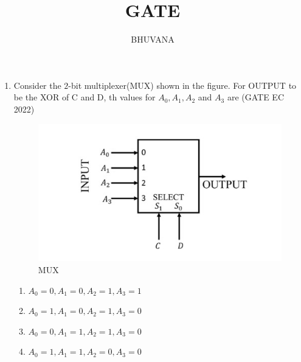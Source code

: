 \documentclass{article}
\begin{document}
 \title{GATE}
 \author{BHUVANA}
 \maketitle

 \begin{enumerate}
 \item

	 Consider the $2$-bit multiplexer(MUX) shown in the figure. For OUTPUT to be the XOR of C and D, th values for $A_0,A_1,A_2$ and $A_3$  are \underline{\hspace{20pt}}  \hfill(GATE EC 2022)
	

	 \begin{figure}[h]
		 \centering
		\includegraphics[width=\columnwidth]{pics/gatepic.jpg}
		\caption{MUX}
		 \label{fig:MUX}
	\end{figure}
	 \begin{enumerate}[label=(\Alph*)]
		\item $A_0=0,A_1=0,A_2=1,A_3=1$
		\item $A_0=1,A_1=0,A_2=1,A_3=0$
		\item $A_0=0,A_1=1,A_2=1,A_3=0$
		\item $A_0=1,A_1=1,A_2=0,A_3=0$
	\end{enumerate}
		 
 \end{enumerate}
\end{document}
